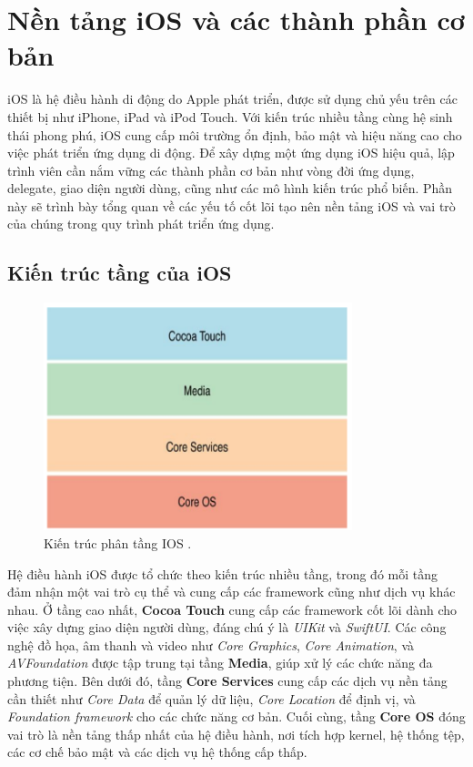 
\section{Nền tảng iOS và các thành phần cơ bản}
\hspace*{0.8cm}iOS là hệ điều hành di động do Apple phát triển, được sử dụng chủ yếu trên các thiết bị như iPhone, iPad và iPod Touch. Với kiến trúc nhiều tầng cùng hệ sinh thái phong phú, iOS cung cấp môi trường ổn định, bảo mật và hiệu năng cao cho việc phát triển ứng dụng di động. Để xây dựng một ứng dụng iOS hiệu quả, lập trình viên cần nắm vững các thành phần cơ bản như vòng đời ứng dụng, delegate, giao diện người dùng, cũng như các mô hình kiến trúc phổ biến. Phần này sẽ trình bày tổng quan về các yếu tố cốt lõi tạo nên nền tảng iOS và vai trò của chúng trong quy trình phát triển ứng dụng.
    \subsection{Kiến trúc tầng của iOS}
        
            \begin{figure}[H] %
                \centering
                \includegraphics[width=0.8\textwidth]{images/kientrucios.png}
                \caption{Kiến trúc phân tầng IOS \cite{kientrucios}.}
                \label{fig:kientrucios}
            \end{figure}

            \hspace*{0.8cm}Hệ điều hành iOS được tổ chức theo kiến trúc nhiều tầng, trong đó mỗi tầng đảm nhận một vai trò cụ thể và cung cấp các framework cũng như dịch vụ khác nhau. Ở tầng cao nhất, \textbf{Cocoa Touch} cung cấp các framework cốt lõi dành cho việc xây dựng giao diện người dùng, đáng chú ý là \textit{UIKit} và \textit{SwiftUI}. Các công nghệ đồ họa, âm thanh và video như \textit{Core Graphics}, \textit{Core Animation}, và \textit{AVFoundation} được tập trung tại tầng \textbf{Media}, giúp xử lý các chức năng đa phương tiện. Bên dưới đó, tầng \textbf{Core Services} cung cấp các dịch vụ nền tảng cần thiết như \textit{Core Data} để quản lý dữ liệu, \textit{Core Location} để định vị, và \textit{Foundation framework} cho các chức năng cơ bản. Cuối cùng, tầng \textbf{Core OS} đóng vai trò là nền tảng thấp nhất của hệ điều hành, nơi tích hợp kernel, hệ thống tệp, các cơ chế bảo mật và các dịch vụ hệ thống cấp thấp.

